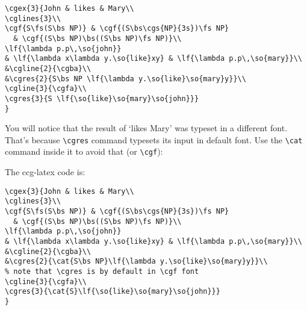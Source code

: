 \documentclass[11pt]{article}
\begin{document}
\begin{verbatim}
\cgex{3}{John & likes & Mary\\
\cglines{3}\\
\cgf{S\fs(S\bs NP)} & \cgf{(S\bs\cgs{NP}{3s})\fs NP} 
  & \cgf{(S\bs NP)\bs((S\bs NP)\fs NP)}\\
\lf{\lambda p.p\,\so{john}} 
& \lf{\lambda x\lambda y.\so{like}xy} & \lf{\lambda p.p\,\so{mary}}\\
&\cgline{2}{\cgba}\\
&\cgres{2}{S\bs NP \lf{\lambda y.\so{like}\so{mary}y}}\\  
\cgline{3}{\cgfa}\\
\cgres{3}{S \lf{\so{like}\so{mary}\so{john}}}
}
\end{verbatim}
\newpage

You will notice that the result of `likes Mary' was typeset in a different font.
That's because \verb|\cgres| command typesets its input in default font.
Use the \verb|\cat| command inside it to avoid that (or \verb|\cgf|):

\medskip\bigskip

The ccg-latex code is:

\begin{verbatim}
\cgex{3}{John & likes & Mary\\
\cglines{3}\\
\cgf{S\fs(S\bs NP)} & \cgf{(S\bs\cgs{NP}{3s})\fs NP} 
  & \cgf{(S\bs NP)\bs((S\bs NP)\fs NP)}\\
\lf{\lambda p.p\,\so{john}} 
& \lf{\lambda x\lambda y.\so{like}xy} & \lf{\lambda p.p\,\so{mary}}\\
&\cgline{2}{\cgba}\\
&\cgres{2}{\cat{S\bs NP}\lf{\lambda y.\so{like}\so{mary}y}}\\  
% note that \cgres is by default in \cgf font
\cgline{3}{\cgfa}\\
\cgres{3}{\cat{S}\lf{\so{like}\so{mary}\so{john}}}
}
\end{verbatim}
\end{document}
